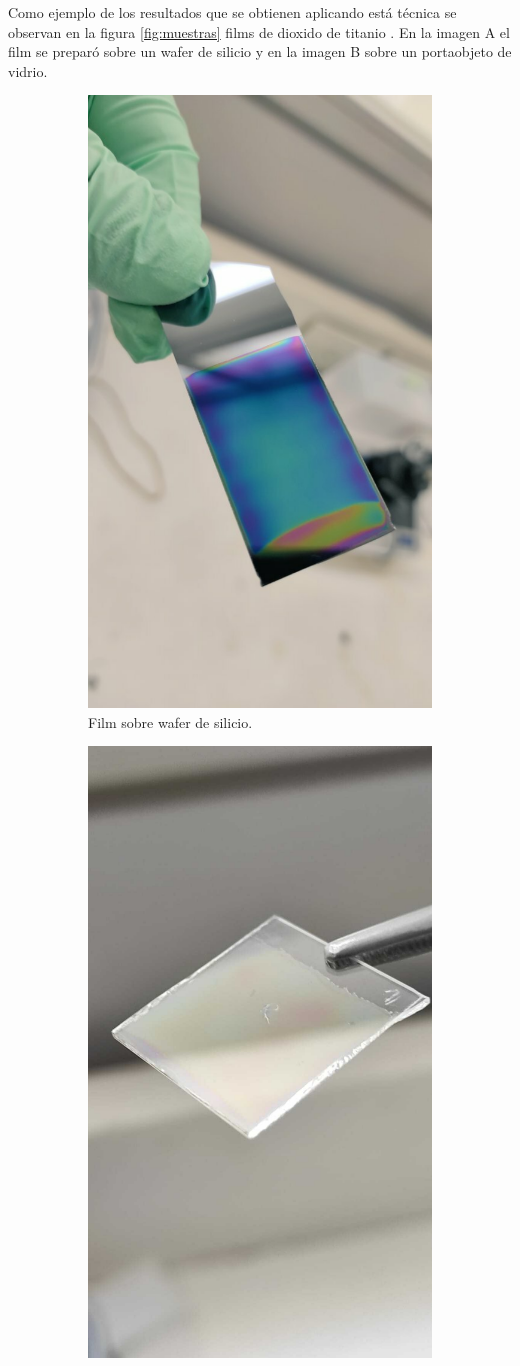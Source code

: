 Como ejemplo de los resultados que se obtienen aplicando está técnica se observan en la figura \ref{fig:muestras} films de dioxido de titanio . En la imagen A el film se preparó sobre un wafer de silicio y en la imagen B sobre un portaobjeto de vidrio.


\begin{figure}[!htpb]
     \centering
     \begin{subfigure}[b]{0.4\textwidth}
         \centering
         \includegraphics[width=.5\textwidth]{./Figures/muestra_1.pdf}
         \caption{Film sobre wafer de silicio.}
         \label{fig:muestra_1}
     \end{subfigure}
     \hfill
     \begin{subfigure}[b]{0.4\textwidth}
         \centering
         \includegraphics[width=.5\textwidth]{./Figures/muestra_2.pdf}

\end{subfigure}
\end{figure}
